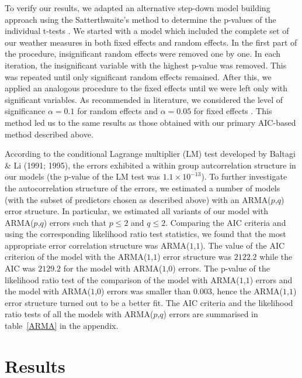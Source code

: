 \documentclass[12pt]{iopart}
\begin{document}
To verify our results, we adapted an alternative step-down model building
approach using the Satterthwaite’s method to determine the p-values of the individual
t-tests \cite{lmerTest}. We started with a model which included the complete set of our weather measures in both fixed effects and random effects. In the first part of the procedure, insignificant random effects were removed one by one. In each iteration, the insignificant variable with the highest p-value was removed. This was repeated until only significant random effects remained. After this, we applied an analogous procedure to the fixed effects until we were left only with significant variables. As recommended in literature, we considered the level of significance $\alpha=0.1$ for random effects and $\alpha=0.05$ for fixed effects \cite{lmerTest}. This method led us to the same results as those obtained with our primary AIC-based method described above.


According to the conditional Lagrange multiplier (LM) test developed by Baltagi \& Li (1991; 1995), the errors exhibited a within group autcorrelation structure in our models (the p-value of the LM test was $1.1\times10^{-13}$). To further investigate the autocorrelation structure of the errors, we estimated a number of models (with the subset of predictors chosen as described above) with an ARMA($p$,$q$) error structure. In particular, we estimated all variants of our model with ARMA($p$,$q$) errors such that $p\leq2$ and $q\leq2$. Comparing the AIC criteria and using the corresponding likelihood ratio test statistics, we found that the most appropriate error correlation structure was ARMA($1$,$1$). The value of the AIC criterion of the model with the ARMA($1$,$1$) error structure was $2122.2$ while the AIC was $2129.2$ for the model with ARMA($1$,$0$) errors.  The p-value of the likelihood ratio test of the comparison of the model with ARMA($1$,$1$) errors and the model with ARMA($1$,$0$) errors was smaller than $0.003$, hence the ARMA($1$,$1$) error structure turned out to be a better fit. The AIC criteria and the likelihood ratio tests of all the models with ARMA($p$,$q$) errors are summarised in table~\ref{ARMA} in the appendix.



	\section{Results}\label{Results}
	
\end{document}
